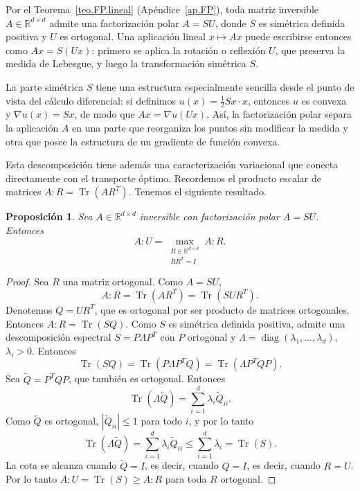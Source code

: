 \documentclass[12pt, a4paper]{amsbook}
\newtheorem{prop}[teo]{Proposición}
\theoremstyle{remark}
\theoremstyle{definition}
\numberwithin{section}{chapter}
\numberwithin{subsection}{section}
\numberwithin{equation}{section}
\numberwithin{figure}{chapter}
\begin{document}
Por el Teorema~\ref{teo.FP.lineal} (Apéndice~\ref{ap.FP}), toda matriz inversible
$A\in\mathbb{R}^{d\times d}$ admite una factorización polar $A=SU$, donde
$S$ es simétrica definida positiva y $U$ es ortogonal. Una aplicación lineal
$x\mapsto Ax$ puede escribirse entonces como $Ax = S(Ux)$: primero se aplica
la rotación o reflexión $U$, que preserva la medida de Lebesgue, y luego la
transformación simétrica $S$.

La parte simétrica $S$ tiene una estructura especialmente sencilla desde el
punto de vista del cálculo diferencial: si definimos $u(x)=\frac{1}{2}Sx\cdot x$,
entonces $u$ es convexa y $\nabla u(x)=Sx$, de modo que $Ax=\nabla u(Ux)$.
Así, la factorización polar separa la aplicación $A$ en una parte que
reorganiza los puntos sin modificar la medida y otra que posee la estructura
de un gradiente de función convexa.

Esta descomposición tiene además una caracterización variacional que conecta
directamente con el transporte óptimo. Recordemos el producto escalar de
matrices $A:R=\operatorname{Tr}(AR^T)$. Tenemos el siguiente resultado.

\begin{prop}\label{prop:U-max}
Sea $A\in\mathbb{R}^{d\times d}$ inversible con factorización polar $A=SU$.
Entonces
\[
A:U=\max_{\substack{R\in\mathbb{R}^{d\times d}\\RR^T=I}}A:R.
\]
\end{prop}
\begin{proof}
Sea $R$ una matriz ortogonal. Como $A=SU$,
\[
A:R=\operatorname{Tr}(AR^T)=\operatorname{Tr}(SUR^T).
\]
Denotemos $Q=UR^T$, que es ortogonal por ser producto de matrices ortogonales.
Entonces $A:R=\operatorname{Tr}(SQ)$. Como $S$ es simétrica definida positiva,
admite una descomposición espectral $S=P\Lambda P^T$ con $P$ ortogonal y
$\Lambda=\operatorname{diag}(\lambda_1,\ldots,\lambda_d)$, $\lambda_i>0$.
Entonces
\[
\operatorname{Tr}(SQ)=\operatorname{Tr}(P\Lambda P^TQ)=\operatorname{Tr}(\Lambda P^TQP).
\]
Sea $\widetilde Q=P^TQP$, que también es ortogonal. Entonces
\[
\operatorname{Tr}(\Lambda\widetilde Q)=\sum_{i=1}^d\lambda_i\widetilde Q_{ii}.
\]
Como $\widetilde Q$ es ortogonal, $|\widetilde Q_{ii}|\le 1$ para todo $i$, y por
lo tanto
\[
\operatorname{Tr}(\Lambda\widetilde Q)=\sum_{i=1}^d\lambda_i\widetilde Q_{ii}
\le\sum_{i=1}^d\lambda_i=\operatorname{Tr}(S).
\]
La cota se alcanza cuando $\widetilde Q=I$, es decir, cuando $Q=I$, es decir,
cuando $R=U$. Por lo tanto $A:U=\operatorname{Tr}(S)\ge A:R$ para toda $R$ ortogonal.
\end{proof}
\end{document}
